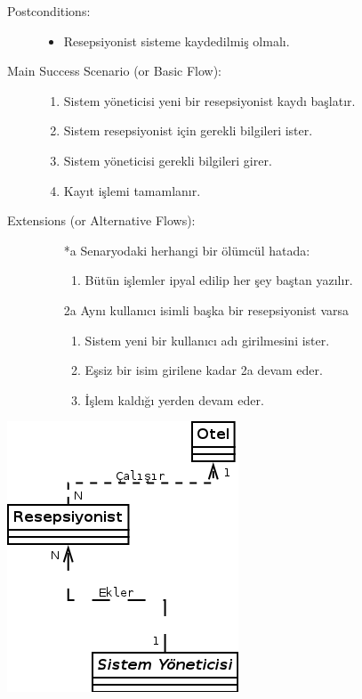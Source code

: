 \documentclass[12pt,a4paper]{report}
\begin{document}
\begin{description}
\item[Postconditions:] \hspace{10mm}
\begin{itemize}
\item Resepsiyonist sisteme kaydedilmiş olmalı.
\end{itemize}
\item[Main Success Scenario (or Basic Flow):] \hspace{10mm}
\begin{enumerate}
\item Sistem yöneticisi yeni bir resepsiyonist kaydı başlatır.
\item Sistem resepsiyonist için gerekli bilgileri ister.
\item Sistem yöneticisi gerekli bilgileri girer.
\item Kayıt işlemi tamamlanır.
\end{enumerate}
\item[Extensions (or Alternative Flows):] \hspace{10mm}
\begin{itemize}
\item[*a] Senaryodaki herhangi bir ölümcül hatada:
    \begin{enumerate}
    \item Bütün işlemler ipyal edilip her şey baştan yazılır.
    \end{enumerate}
\item[2a] Aynı kullanıcı isimli başka bir resepsiyonist varsa
    \begin{enumerate}
    \item Sistem yeni bir kullanıcı adı girilmesini ister.
    \item Eşsiz bir isim girilene kadar 2a devam eder.
    \item İşlem kaldığı yerden devam eder.
    \end{enumerate}
\end{itemize}
\end{description}

\begin{center}
\includegraphics{dia/usecase5.png}
\end{center}
\end{document}

